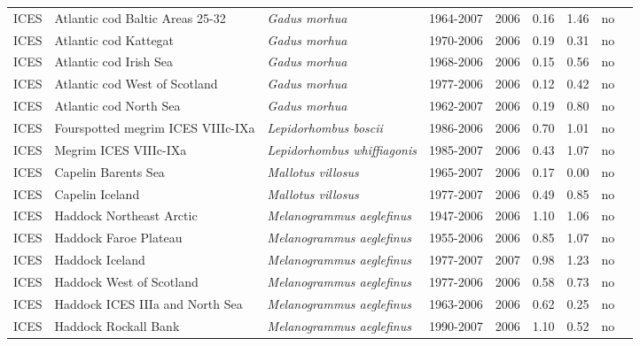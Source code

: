 \begin{longtable}{p{1.8cm}p{4cm}p{4cm}ccccp{1.9cm}c}
  ICES & Atlantic cod Baltic Areas 25-32 & \textit{Gadus morhua} & 1964-2007 & 2006 & 0.16 & 1.46 & no & \cite{ICES-WGBFAS-2007.pdf} \\ 
  ICES & Atlantic cod Kattegat & \textit{Gadus morhua} & 1970-2006 & 2006 & 0.19 & 0.31 & no & \cite{ICES-WGBFAS-2007.pdf} \\ 
  ICES & Atlantic cod Irish Sea & \textit{Gadus morhua} & 1968-2006 & 2006 & 0.15 & 0.56 & no & \cite{ICES-WGNSDS-2007.pdf} \\ 
  ICES & Atlantic cod West of Scotland & \textit{Gadus morhua} & 1977-2006 & 2006 & 0.12 & 0.42 & no & \cite{ICES-WGNSDS-2007.pdf} \\ 
  ICES & Atlantic cod North Sea & \textit{Gadus morhua} & 1962-2007 & 2006 & 0.19 & 0.80 & no & \cite{ICES-WGNSSK-2007.pdf} \\ 
  ICES & Fourspotted megrim ICES VIIIc-IXa & \textit{Lepidorhombus boscii} & 1986-2006 & 2006 & 0.70 & 1.01 & no & \cite{ICES-WGHMM-2007.pdf} \\ 
  ICES & Megrim ICES VIIIc-IXa & \textit{Lepidorhombus whiffiagonis} & 1985-2007 & 2006 & 0.43 & 1.07 & no & \cite{ICES-WGHMM-2007.pdf} \\ 
  ICES & Capelin Barents Sea & \textit{Mallotus villosus} & 1965-2007 & 2006 & 0.17 & 0.00 & no & \cite{ICES-AFWG-2007.pdf} \\ 
  ICES & Capelin Iceland & \textit{Mallotus villosus} & 1977-2007 & 2006 & 0.49 & 0.85 & no & \cite{ICES-NWWG-2007.pdf} \\ 
  ICES & Haddock Northeast Arctic & \textit{Melanogrammus aeglefinus} & 1947-2006 & 2006 & 1.10 & 1.06 & no & \cite{ICES-AFWG-2007.pdf} \\ 
  ICES & Haddock Faroe Plateau & \textit{Melanogrammus aeglefinus} & 1955-2006 & 2006 & 0.85 & 1.07 & no & \cite{ICES-NWWG-2007.pdf} \\ 
  ICES & Haddock Iceland & \textit{Melanogrammus aeglefinus} & 1977-2007 & 2007 & 0.98 & 1.23 & no & \cite{ICES-NWWG-2007.pdf} \\ 
  ICES & Haddock West of Scotland & \textit{Melanogrammus aeglefinus} & 1977-2006 & 2006 & 0.58 & 0.73 & no & \cite{ICES-WGNSDS-2007.pdf} \\ 
  ICES & Haddock ICES IIIa and North Sea & \textit{Melanogrammus aeglefinus} & 1963-2006 & 2006 & 0.62 & 0.25 & no & \cite{ICES-WGNSSK-2007.pdf} \\ 
  ICES & Haddock Rockall Bank & \textit{Melanogrammus aeglefinus} & 1990-2007 & 2006 & 1.10 & 0.52 & no & \cite{ICES-WGNSDS-2007.pdf} \\ 

\end{longtable}
